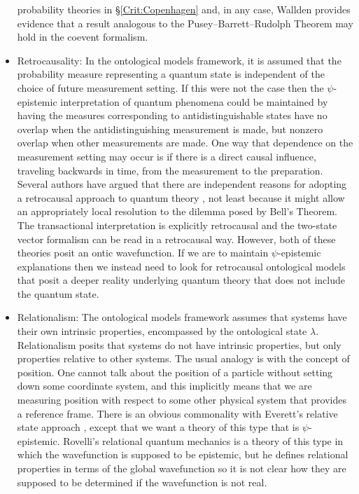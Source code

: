 \documentclass[DIV=calc,fontsize=12pt]{scrartcl} %
\theoremstyle{definition}
\theoremstyle{plain}
\begin{document}
\begin{itemize}
probability theories in \S\ref{Crit:Copenhagen} and, in any case,
Wallden \cite{Wallden2013} provides evidence that a result analogous
to the Pusey--Barrett--Rudolph Theorem may hold in the coevent formalism.
\item Retrocausality: In the ontological models framework, it is
assumed that the probability measure representing a quantum state is
independent of the choice of future measurement setting.  If this
were not the case then the $\psi$-epistemic interpretation of
quantum phenomena could be maintained by having the measures
corresponding to antidistinguishable states have no overlap when the
antidistinguishing measurement is made, but nonzero overlap when
other measurements are made.  One way that dependence on the
measurement setting may occur is if there is a direct causal
influence, traveling backwards in time, from the measurement to the
preparation.  Several authors have argued that there are independent
reasons for adopting a retrocausal approach to quantum theory
\cite{CostadeBeauregard1976, Price2012, Price2013}, not least
because it might allow an appropriately local resolution to the
dilemma posed by Bell's Theorem.  The transactional interpretation
\cite{Cramer1986, Kastner2013} is explicitly retrocausal and the
two-state vector formalism \cite{Aharonov2002} can be read in a
retrocausal way.  However, both of these theories posit an ontic
wavefunction.  If we are to maintain $\psi$-epistemic explanations
then we instead need to look for retrocausal ontological models that
posit a deeper reality underlying quantum theory that does not
include the quantum state.
\item Relationalism: The ontological models framework assumes that
systems have their own intrinsic properties, encompassed by the
ontological state $\lambda$.  Relationalism posits that systems do
not have intrinsic properties, but only properties relative to other
systems.  The usual analogy is with the concept of position.  One
cannot talk about the position of a particle without setting down
some coordinate system, and this implicitly means that we are
measuring position with respect to some other physical system that
provides a reference frame.  There is an obvious commonality with
Everett's relative state approach \cite{Everett1957}, except that we
want a theory of this type that is $\psi$-epistemic.  Rovelli's
relational quantum mechanics \cite{Rovelli1996} is a theory of this
type in which the wavefunction is supposed to be epistemic, but he
defines relational properties in terms of the global wavefunction so
it is not clear how they are supposed to be determined if the
wavefunction is not real.
\end{itemize}
\end{document}

